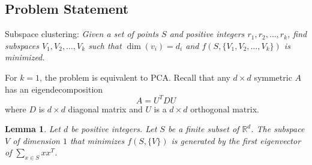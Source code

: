\documentclass{article}
\newtheorem{lemma}[theorem]{Lemma}
\newcommand{\R}{\mathbb{R}}
\begin{document}
\subsection{Problem Statement}

Subspace clustering: \emph{Given a set of points $S$ and positive integers
$r_1, r_2, \dots, r_k$, find subspaces $V_1, V_2, \dots, V_k$ such that
$\dim(v_i) = d_i$ and $f(S, \{V_1, V_2, \dots, V_k\})$ is minimized.}

For $k=1$, the problem is equivalent to PCA. Recall that any $d \times d$
symmetric $A$ has an eigendecomposition
$$
A = U^T D U
$$
where $D$ is $d \times d$ diagonal matrix and $U$ is a $d \times d$
orthogonal matrix.

\begin{lemma}
Let $d$ be positive integers. Let $S$ be a finite subset of $\R^d$.
The subspace $V$ of dimension $1$ that minimizes $f(S, \{V\})$ is generated
by the first eigenvector of $\sum_{x \in S} xx^T$.
\end{lemma}
\end{document}
